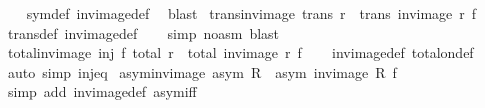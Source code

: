 \begin{isabellebody}
%
\isadelimproof
\ \ %
\endisadelimproof
%
\isatagproof
{}\isamarkupfalse%
\ sym{\isacharunderscore}{\kern0pt}def\ inv{\isacharunderscore}{\kern0pt}image{\isacharunderscore}{\kern0pt}def\ \isamarkupfalse%
\ blast%
\endisatagproof
{\isafoldproof}%
%
\isadelimproof
\isanewline
%
\endisadelimproof
\isanewline
{}\isamarkupfalse%
\ trans{\isacharunderscore}{\kern0pt}inv{\isacharunderscore}{\kern0pt}image{\isacharcolon}{\kern0pt}\ {\isachardoublequoteopen}trans\ r\ {\isasymLongrightarrow}\ trans\ {\isacharparenleft}{\kern0pt}inv{\isacharunderscore}{\kern0pt}image\ r\ f{\isacharparenright}{\kern0pt}{\isachardoublequoteclose}\isanewline
%
\isadelimproof
\ \ %
\endisadelimproof
%
\isatagproof
{}\isamarkupfalse%
\ trans{\isacharunderscore}{\kern0pt}def\ inv{\isacharunderscore}{\kern0pt}image{\isacharunderscore}{\kern0pt}def\isanewline
\ \ \isamarkupfalse%
\ {\isacharparenleft}{\kern0pt}simp\ {\isacharparenleft}{\kern0pt}no{\isacharunderscore}{\kern0pt}asm{\isacharparenright}{\kern0pt}{\isacharparenright}{\kern0pt}\ blast%
\endisatagproof
{\isafoldproof}%
%
\isadelimproof
\isanewline
%
\endisadelimproof
\isanewline
{}\isamarkupfalse%
\ total{\isacharunderscore}{\kern0pt}inv{\isacharunderscore}{\kern0pt}image{\isacharcolon}{\kern0pt}\ {\isachardoublequoteopen}{\isasymlbrakk}inj\ f{\isacharsemicolon}{\kern0pt}\ total\ r{\isasymrbrakk}\ {\isasymLongrightarrow}\ total\ {\isacharparenleft}{\kern0pt}inv{\isacharunderscore}{\kern0pt}image\ r\ f{\isacharparenright}{\kern0pt}{\isachardoublequoteclose}\isanewline
%
\isadelimproof
\ \ %
\endisadelimproof
%
\isatagproof
{}\isamarkupfalse%
\ inv{\isacharunderscore}{\kern0pt}image{\isacharunderscore}{\kern0pt}def\ total{\isacharunderscore}{\kern0pt}on{\isacharunderscore}{\kern0pt}def\ \isamarkupfalse%
\ {\isacharparenleft}{\kern0pt}auto\ simp{\isacharcolon}{\kern0pt}\ inj{\isacharunderscore}{\kern0pt}eq{\isacharparenright}{\kern0pt}%
\endisatagproof
{\isafoldproof}%
%
\isadelimproof
\isanewline
%
\endisadelimproof
\isanewline
{}\isamarkupfalse%
\ asym{\isacharunderscore}{\kern0pt}inv{\isacharunderscore}{\kern0pt}image{\isacharcolon}{\kern0pt}\ {\isachardoublequoteopen}asym\ R\ {\isasymLongrightarrow}\ asym\ {\isacharparenleft}{\kern0pt}inv{\isacharunderscore}{\kern0pt}image\ R\ f{\isacharparenright}{\kern0pt}{\isachardoublequoteclose}\isanewline
%
\isadelimproof
\ \ %
\endisadelimproof
%
\isatagproof
{}\isamarkupfalse%
\ {\isacharparenleft}{\kern0pt}simp\ add{\isacharcolon}{\kern0pt}\ inv{\isacharunderscore}{\kern0pt}image{\isacharunderscore}{\kern0pt}def\ asym{\isacharunderscore}{\kern0pt}iff{\isacharparenright}{\kern0pt}%

\end{isabellebody}
